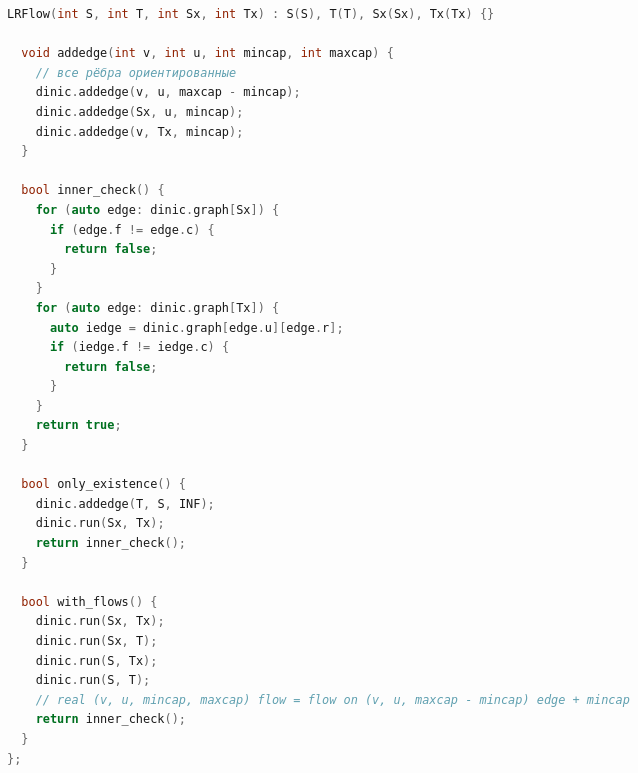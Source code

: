 \documentclass[9pt,a4paper,landscape,twosided]{extarticle}
\begin{document}
\begin{multicols*}{3}
\begin{lstlisting}[language=C++]
  LRFlow(int S, int T, int Sx, int Tx) : S(S), T(T), Sx(Sx), Tx(Tx) {}

  void addedge(int v, int u, int mincap, int maxcap) {
    // все рёбра ориентированные
    dinic.addedge(v, u, maxcap - mincap);
    dinic.addedge(Sx, u, mincap);
    dinic.addedge(v, Tx, mincap);
  }

  bool inner_check() {
    for (auto edge: dinic.graph[Sx]) {
      if (edge.f != edge.c) {
        return false;
      }
    }
    for (auto edge: dinic.graph[Tx]) {
      auto iedge = dinic.graph[edge.u][edge.r];
      if (iedge.f != iedge.c) {
        return false;
      }
    }
    return true;
  }

  bool only_existence() {
    dinic.addedge(T, S, INF);
    dinic.run(Sx, Tx);
    return inner_check();
  }

  bool with_flows() {
    dinic.run(Sx, Tx);
    dinic.run(Sx, T);
    dinic.run(S, Tx);
    dinic.run(S, T);
    // real (v, u, mincap, maxcap) flow = flow on (v, u, maxcap - mincap) edge + mincap
    return inner_check();
  }
};
\end{lstlisting}


\end{multicols*}
\end{document}
